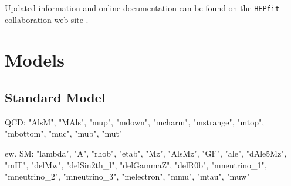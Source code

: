 \documentclass[preprint,3p,12pt]{elsarticle}
\newcommand{\HEPfit}{\texttt{HEPfit}\xspace}
\begin{document}
Updated information and online documentation can be found on the
\HEPfit collaboration web site \cite{website}.




\section{Models}
\label{sec:Models}

\subsection{Standard Model}
\label{sec:SM}

QCD:
    "AlsM", "MAls",
    "mup", "mdown", "mcharm", "mstrange", "mtop", "mbottom",
    "muc", "mub", "mut"

ew. SM:
"lambda", "A", "rhob", "etab", "Mz", "AlsMz", "GF", "ale", "dAle5Mz", "mHl", "delMw", "delSin2th_l", "delGammaZ", "delR0b",
"mneutrino_1", "mneutrino_2", "mneutrino_3", "melectron", "mmu", "mtau", "muw"
\end{document}
